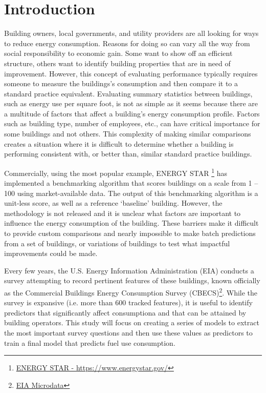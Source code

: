 \section{Introduction}
\label{sec:introduction}

Building owners, local governments, and utility providers are all looking for ways to reduce energy consumption.  Reasons for doing so can vary all the way from social responsibility to economic gain.  Some  want to show off an efficient structure, others want to identify building properties that are in need of improvement.  However, this concept of evaluating performance typically requires someone to measure the buildings's consumption and then compare it to a standard practice equivalent.  Evaluating summary statistics between buildings, such as energy use per square foot, is not as simple as it seems because there are a multitude of factors that affect a building’s energy consumption profile.  Factors such as building type, number of employees, etc., can have critical importance for some buildings and not others.  This complexity of making similar comparisons creates a situation where it is difficult to determine whether a building is performing consistent with, or better than, similar standard practice buildings.

Commercially, using the most popular example, ENERGY STAR \footnote{\href{https://www.energystar.gov/}{ENERGY STAR - \url{https://www.energystar.gov/}}} has implemented a benchmarking algorithm that scores buildings on a scale from 1 – 100 using market-available data.  The output of this benchmarking algorithm is a unit-less score, as well as a reference ‘baseline’ building.  However, the methodology is not released and it is unclear what factors are important to influence the energy consumption of the building.  These barriers make it difficult to provide custom comparisons and nearly impossible to make batch predictions from a set of buildings, or variations of buildings to test what impactful improvements could be made.

Every few years, the U.S. Energy Information Administration (EIA) conducts a survey attempting to record pertinent features of these buildings, known officially as the Commercial Buildings Energy Consumption Survey (CBECS)\footnote{\href{https://www.eia.gov/consumption/commercial/data/2012/index.php?view=microdata}{EIA Microdata}}.  While the survey is expansive (i.e. more than 600 tracked features), it is useful to identify predictors that significantly affect consumptiona and that can be attained by building operators.  This study will focus on creating a series of models to extract the most important survey questions and then use these values as predictors to train a final model that predicts fuel use consumption.